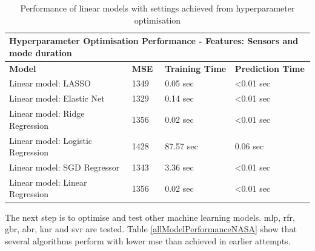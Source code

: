 \documentclass[english, a4paper]{report}
\begin{document}
{{{{                \begin{table}[H]
                    \centering
                    \begin{tabular}{|l|l|l|l|}
                        \hline \multicolumn{4}{|l|}{\textbf{Hyperparameter Optimisation Performance - Features: Sensors and mode duration}} \\ \hline
                        \textbf{Model} & \textbf{MSE} & \textbf{Training Time} & \textbf{Prediction Time} \\ \hline
                        Linear model: LASSO & 1349 & 0.05 sec & \textless0.01 sec \\ \hline
                        Linear model: Elastic Net & 1329 & 0.14 sec & \textless0.01 sec \\ \hline
                        Linear model: Ridge Regression & 1356 & 0.02 sec & \textless0.01 sec \\ \hline
                        Linear model: Logistic Regression & 1428 & 87.57 sec & 0.06 sec \\ \hline
                        Linear model: SGD Regressor & 1343 & 3.36 sec & \textless0.01 sec \\ \hline
                        Linear model: Linear Regression & 1356 & 0.02 sec & \textless0.01 sec \\ \hline
                    \end{tabular}
                    \caption{Performance of linear models with settings achieved from hyperparameter optimisation}
                    \label{linearModelPerformanceNASA}
                \end{table}
                
                The next step is to optimise and test other machine learning models. \Gls{mlp}, \gls{rfr}, \gls{gbr}, \gls{abr}, \gls{knr} and \gls{svr} are tested. Table \ref{allModelPerformanceNASA} show that several algorithms perform with lower \gls{mse} than achieved in earlier attempts. 
                
}}}}
\end{document}
